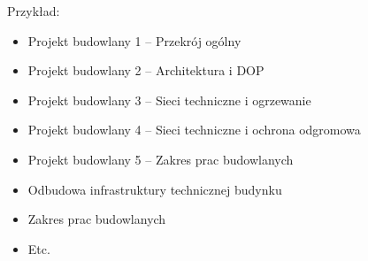 Przykład:

\begin{itemize}
	\item Projekt budowlany 1 – Przekrój ogólny
	\item Projekt budowlany 2 – Architektura i DOP
	\item Projekt budowlany 3 – Sieci techniczne i ogrzewanie
	\item Projekt budowlany 4 – Sieci techniczne i ochrona odgromowa
	\item Projekt budowlany 5 – Zakres prac budowlanych
	\item Odbudowa infrastruktury technicznej budynku
	\item Zakres prac budowlanych
	\item Etc.
\end{itemize}
